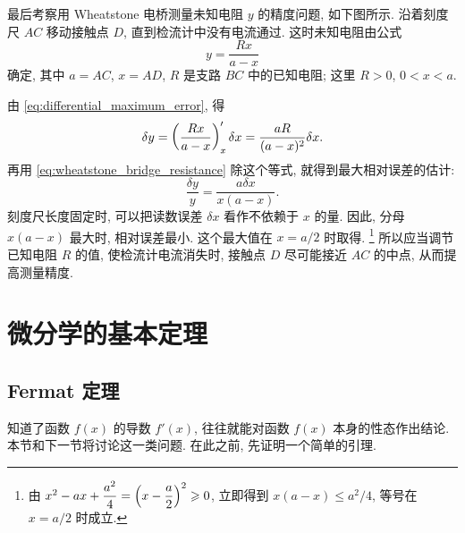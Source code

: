\label{ex:wheatstone_bridge_error}
最后考察用 Wheatstone 电桥测量未知电阻 $y$ 的精度问题, 如下图所示.
沿着刻度尺 $AC$ 移动接触点 $D$, 直到检流计中没有电流通过.
这时未知电阻由公式
\begin{equation}\label{eq:wheatstone_bridge_resistance}
y=\frac{Rx}{a-x}
\end{equation}
确定, 其中 $a=AC$, $x=AD$, $R$ 是支路 $BC$ 中的已知电阻;
这里 $R>0$, $0<x<a$.

\begin{center}
\label{fig:wheatstone_bridge}
\end{center}

由 \eqref{eq:differential_maximum_error}, 得
$$
\delta y=\left( \frac{Rx}{a-x} \right)'_x\delta x
=\frac{aR}{(a-x)^2}\delta x.
$$
再用 \eqref{eq:wheatstone_bridge_resistance} 除这个等式, 就得到最大相对误差的估计:
$$
\frac{\delta y}{y}=\frac{a\delta x}{x(a-x)}.
$$
刻度尺长度固定时, 可以把读数误差 $\delta x$ 看作不依赖于 $x$ 的量.
因此, 分母 $x(a-x)$ 最大时, 相对误差最小.
这个最大值在 $x=a/2$ 时取得.
\footnote{由 $x^2-ax+\dfrac{a^2}{4}=\left( x-\dfrac a2 \right)^2\geqslant0$,
立即得到 $x(a-x)\leq a^2/4$, 等号在 $x=a/2$ 时成立.}
所以应当调节已知电阻 $R$ 的值, 使检流计电流消失时,
接触点 $D$ 尽可能接近 $AC$ 的中点, 从而提高测量精度.

\section{微分学的基本定理}\label{sec:fundamental_differential_theorems}
\subsection{Fermat 定理}\label{subsec:109}
知道了函数 $f(x)$ 的导数 $f'(x)$, 往往就能对函数 $f(x)$ 本身的性态作出结论.
本节和下一节将讨论这一类问题.
在此之前, 先证明一个简单的引理.

